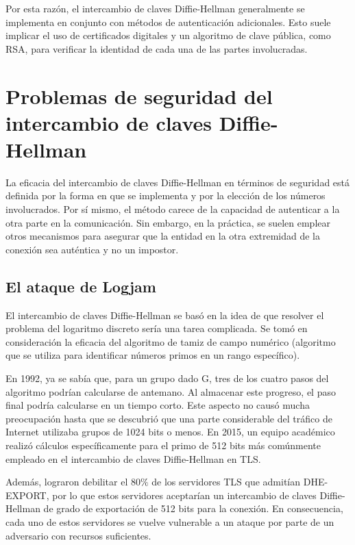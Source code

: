 \documentclass[11pt]{article}
\begin{document}
Por esta razón, el intercambio de claves Diffie-Hellman generalmente se implementa en conjunto con métodos de autenticación adicionales. Esto suele implicar el uso de certificados digitales y un algoritmo de clave pública, como RSA, para verificar la identidad de cada una de las partes involucradas.


\section{Problemas de seguridad del intercambio de claves Diffie-Hellman}
La eficacia del intercambio de claves Diffie-Hellman en términos de seguridad está definida por la forma en que se implementa y por la elección de los números involucrados. Por sí mismo, el método carece de la capacidad de autenticar a la otra parte en la comunicación. Sin embargo, en la práctica, se suelen emplear otros mecanismos para asegurar que la entidad en la otra extremidad de la conexión sea auténtica y no un impostor.

\subsection {El ataque de Logjam}

El intercambio de claves Diffie-Hellman se basó en la idea de que resolver el problema del logaritmo discreto sería una tarea complicada. Se tomó en consideración la eficacia del algoritmo de tamiz de campo numérico (algoritmo que se utiliza para identificar números primos en un rango específico).

\newpage

En 1992, ya se sabía que, para un grupo dado G, tres de los cuatro pasos del algoritmo podrían calcularse de antemano. Al almacenar este progreso, el paso final podría calcularse en un tiempo corto. Este aspecto no causó mucha preocupación hasta que se descubrió que una parte considerable del tráfico de Internet utilizaba grupos de 1024 bits o menos. En 2015, un equipo académico realizó cálculos específicamente para el primo de 512 bits más comúnmente empleado en el intercambio de claves Diffie-Hellman en TLS.

Además, lograron debilitar el 80$\%$ de los servidores TLS que admitían DHE-EXPORT, por lo que estos servidores aceptarían un intercambio de claves Diffie-Hellman de grado de exportación de 512 bits para la conexión. En consecuencia, cada uno de estos servidores se vuelve vulnerable a un ataque por parte de un adversario con recursos suficientes.
\end{document}
